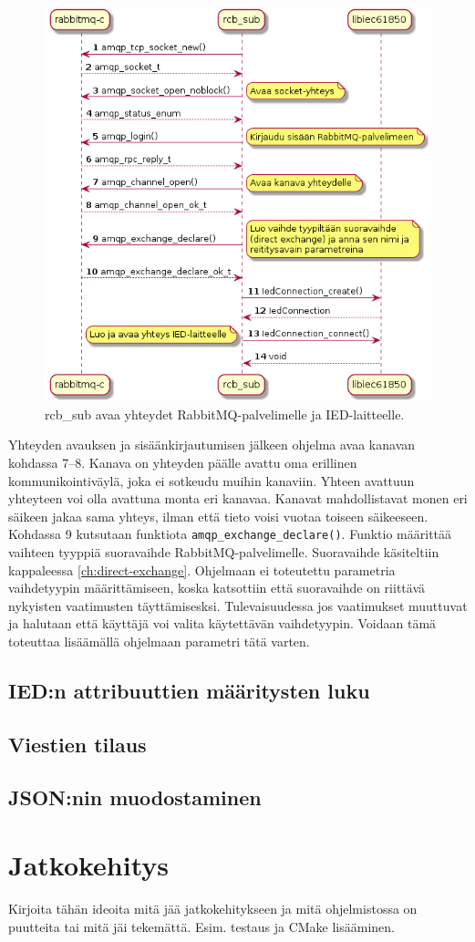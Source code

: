 \begin{figure}[ht!]
	\includegraphics[width=1\textwidth]{pictures/rcb-sub-open-connections.png}
	\caption{rcb\_sub avaa yhteydet RabbitMQ-palvelimelle ja IED-laitteelle.}
	\label{fig:rcb-sub-open-connections}
\end{figure}

Yhteyden avauksen ja sisäänkirjautumisen jälkeen ohjelma avaa kanavan kohdassa 7--8. Kanava on yhteyden päälle avattu oma erillinen kommunikointiväylä, joka ei sotkeudu muihin kanaviin. Yhteen avattuun yhteyteen voi olla avattuna monta eri kanavaa. Kanavat mahdollistavat monen eri säikeen jakaa sama yhteys, ilman että tieto voisi vuotaa toiseen säikeeseen. Kohdassa 9 kutsutaan funktiota \texttt{amqp\_exchange\_declare()}. Funktio määrittää vaihteen tyyppiä suoravaihde RabbitMQ-palvelimelle. Suoravaihde käsiteltiin kappaleessa \ref{ch:direct-exchange}. Ohjelmaan ei toteutettu parametria vaihdetyypin määrittämiseen, koska katsottiin että suoravaihde on riittävä nykyisten vaatimusten täyttämisesksi. Tulevaisuudessa jos vaatimukset muuttuvat ja halutaan että käyttäjä voi valita käytettävän vaihdetyypin. Voidaan tämä toteuttaa lisäämällä ohjelmaan parametri tätä varten.


\subsection{IED:n attribuuttien määritysten luku}


\subsection{Viestien tilaus}


\subsection{JSON:nin muodostaminen}


\section{Jatkokehitys}
\begin{it}
	Kirjoita tähän ideoita mitä jää jatkokehitykseen ja mitä ohjelmistossa on puutteita tai mitä jäi tekemättä. Esim. testaus ja CMake lisääminen.
\end{it}